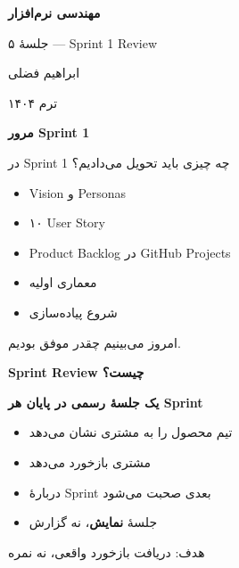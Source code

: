\documentclass[14pt, a4paper, landscape]{extarticle}
\newcommand{\slide}[1]{%
    \newpage
    \begin{center}
    \begin{minipage}[t]{0.95\textwidth}
    \vspace{0.5cm}
    #1
    \vspace{0.5cm}
    \end{minipage}
    \end{center}
}
\newcommand{\slidetitle}[1]{%
    \begin{center}
        {\LARGE\bfseries\textcolor{primary}{#1}}
    \end{center}
    \vspace{0.5cm}
}
\newcommand{\myaccent}[1]{\textcolor{accent}{#1}}
\begin{document}
\pagestyle{empty}


\begin{center}
    \vspace*{4cm}
    {\color{white}\Huge\bfseries مهندسی نرم‌افزار}
    
    \vspace{1cm}
    
    {\color{accent}\LARGE جلسهٔ ۵ — Sprint 1 Review}
    
    \vspace{2cm}
    
    {\color{white}\Large ابراهیم فضلی}
    
    \vspace{0.5cm}
    
    {\color{white}\large ترم ۱۴۰۴}
\end{center}

\pagestyle{fancy}

\slide{
    \slidetitle{مرور Sprint 1}
    \vspace{0.5cm}
    {\large در Sprint 1 چه چیزی باید تحویل می‌دادیم؟}
    \vspace{0.8cm}
    \begin{itemize}[itemsep=0.5em]
        \item Vision و Personas
        \item ۱۰ User Story
        \item Product Backlog در GitHub Projects
        \item معماری اولیه
        \item شروع پیاده‌سازی
    \end{itemize}
    \vspace{0.8cm}
    \begin{center}
        {\myaccent{امروز می‌بینیم چقدر موفق بودیم.}}
    \end{center}
}

\slide{
    \slidetitle{Sprint Review چیست؟}
    \vspace{0.5cm}
    \begin{center}
        {\large\bfseries یک جلسهٔ رسمی در پایان هر Sprint}
    \end{center}
    \vspace{0.8cm}
    \begin{itemize}[itemsep=0.6em]
        \item {\large تیم محصول را به مشتری نشان می‌دهد}
        \item {\large مشتری بازخورد می‌دهد}
        \item {\large دربارهٔ Sprint بعدی صحبت می‌شود}
        \item {\large جلسهٔ \textbf{نمایش}، نه گزارش}
    \end{itemize}
    \vspace{0.8cm}
    \begin{center}
        {\myaccent{هدف: دریافت بازخورد واقعی، نه نمره}}
    \end{center}
}
\end{document}
